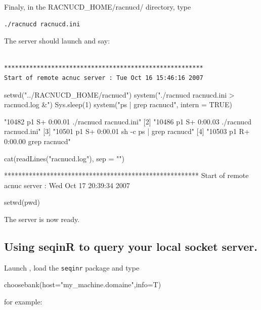 \documentclass{article}
\begin{document}
Finaly, in the RACNUCD\_HOME/racnucd/ directory, type
\begin{verbatim}
./racnucd racnucd.ini
\end{verbatim}

The server should launch and say:
\begin{verbatim}

*******************************************************
Start of remote acnuc server : Tue Oct 16 15:46:16 2007

\end{verbatim}


\begin{Schunk}
\begin{Sinput}
 setwd("../RACNUCD_HOME/racnucd")
 system("./racnucd racnucd.ini > racnucd.log &")
 Sys.sleep(1)
 system("ps | grep racnucd", intern = TRUE)
\end{Sinput}
\begin{Soutput}
[1] "10482  p1  S+     0:00.01 ./racnucd racnucd.ini"  
[2] "10486  p1  S+     0:00.03 ./racnucd racnucd.ini"  
[3] "10501  p1  S+     0:00.01 sh -c ps | grep racnucd"
[4] "10503  p1  R+     0:00.00 grep racnucd"           
\end{Soutput}
\begin{Sinput}
 cat(readLines("racnucd.log"), sep = "\n")
\end{Sinput}
\begin{Soutput}
*******************************************************
Start of remote acnuc server : Wed Oct 17 20:39:34 2007
\end{Soutput}
\begin{Sinput}
 setwd(pwd)
\end{Sinput}
\end{Schunk}

The server is now ready.

\subsection{Using seqinR to query your local socket server.}
Launch \Rlogo{}, load the \texttt{seqinr} package  and type

\begin{Schunk}
\begin{Sinput}
choosebank(host="my_machine.domaine",info=T)
\end{Sinput}
\end{Schunk}
for example:
\end{document}

